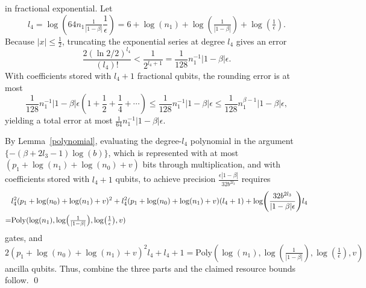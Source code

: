 \documentclass[aps,pra,twocolumn,superscriptaddress,preprintnumbers,amsmath,amssymb]{revtex4-2}
\begin{document}
in fractional exponential. Let 
\begin{equation}
  l_4=\log(64n_1\tfrac{1}{|1-\beta|}\frac{1}{\epsilon})=6+\log(n_1)+\log(\tfrac{1}{|1-\beta|})+\log(\tfrac{1}{\epsilon}).
\end{equation}
Because $|x|\leq\frac{1}{2}$, truncating the exponential series at degree $l_4$ gives an error
\begin{equation}
    \frac{2(\ln 2/2)^{l_4}}{(l_4)!}
    <\frac{1}{2^{l_4+1}}=\frac{1}{128}n_1^{-1}|1-\beta|\epsilon.
\end{equation}
With coefficients stored with $l_4+1$ fractional qubits,  the rounding error is at most 
\begin{equation}
    \frac{1}{128}n_1^{-1} |1-\beta|\epsilon(1+\frac{1}{2}+\frac{1}{4}+\cdots)\leq\frac{1}{128}n_1^{-1} |1-\beta|\epsilon\leq \frac{1}{128}n_1^{\beta-1} |1-\beta|\epsilon,
\end{equation}
yielding a total error  at most $\frac{1}{64}n_1^{-1}|1-\beta|\epsilon$.\par
 By Lemma~\ref{polynomial}, evaluating the degree-$l_4$ polynomial in the argument
 $\{-(\beta+2l_3-1)\log(b)\}$, which is represented with at most $(p_1+\log(n_1)+\log(n_0)+v)$ bits through  multiplication, and with coefficients  stored with $l_4+1$ qubits, to achieve precision $\frac{\epsilon|1-\beta|}{32b^{2l_3}}$ requires
 \begin{align}
     &l_4^2(p_1+\log(n_0)+\log(n_1)+v)^2+l_4^2(p_1+\log(n_0)+\log(n_1)+v)(l_4+1)
     +\log(\frac{32b^{2l_3}}{|1-\beta|\epsilon})l_4\notag\\
     =&\mathrm{Poly}(\log(n_1),\log(\tfrac{1}{|1-\beta|}),\log(\tfrac{1}{\epsilon}),v)
 \end{align}
 gates, and 
  \begin{equation}
     2(p_1+\log(n_0)+\log(n_1)+v)^2l_4+l_4+1
     =\mathrm{Poly}(\log(n_1),\log(\tfrac{1}{|1-\beta|}),\log(\tfrac{1}{\epsilon}),v)
 \end{equation}
 ancilla qubits. Thus, combine the three parts and the claimed resource bounds follow. \qed
\end{document}
